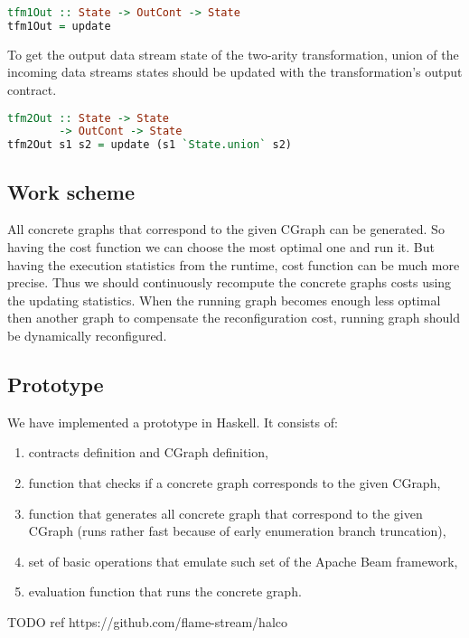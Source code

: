 \begin{lstlisting}[language=Haskell]
tfm1Out :: State -> OutCont -> State
tfm1Out = update
\end{lstlisting}

To get the output data stream state of the two-arity transformation, union of the incoming data streams states should be updated with the transformation's output contract.

\begin{lstlisting}[language=Haskell]
tfm2Out :: State -> State
        -> OutCont -> State
tfm2Out s1 s2 = update (s1 `State.union` s2)
\end{lstlisting}

\subsection{Work scheme}

All concrete graphs that correspond to the given CGraph can be generated.
So having the cost function we can choose the most optimal one and run it.
But having the execution statistics from the runtime, cost function can be much more precise.
Thus we should continuously recompute the concrete graphs costs using the updating statistics.
When the running graph becomes enough less optimal then another graph to compensate the reconfiguration cost, running graph should be dynamically reconfigured.

\subsection{Prototype}

We have implemented a prototype in Haskell.
It consists of:
\begin{enumerate}
    \item contracts definition and CGraph definition,
    \item function that checks if a concrete graph corresponds to the given CGraph,
    \item function that generates all concrete graph that correspond to the given CGraph (runs rather fast because of early enumeration branch truncation),
    \item set of basic operations that emulate such set of the Apache Beam framework,
    \item evaluation function that runs the concrete graph.
\end{enumerate}

TODO ref https://github.com/flame-stream/halco
